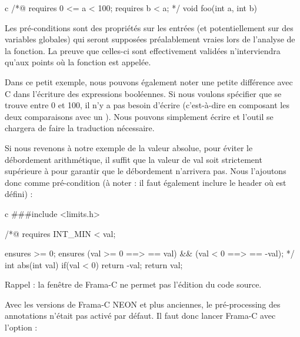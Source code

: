 \begin{CodeBlock}{c}
/*@
  requires 0 <= a < 100;
  requires b < a;
*/
void foo(int a, int b){
  
}
\end{CodeBlock}



Les pré-conditions sont des propriétés sur les entrées (et potentiellement sur
des variables globales) qui seront supposées préalablement vraies lors de 
l'analyse de la fonction. La preuve que celles-ci sont effectivement validées 
n'interviendra qu'aux points où la fonction est appelée.



Dans ce petit exemple, nous pouvons également noter une petite différence avec 
C dans l'écriture des expressions booléennes. Si nous voulons spécifier 
que  se trouve entre 0 et 100, il n'y a pas besoin d'écrire 
(c'est-à-dire en composant les deux comparaisons avec un \CodeInline{\&\&}). Nous 
pouvons simplement écrire  et l'outil se chargera de faire
la traduction nécessaire.



Si nous revenons à notre exemple de la valeur absolue, pour éviter le 
débordement arithmétique, il suffit que la valeur de val soit strictement 
supérieure à  pour garantir que le débordement n'arrivera pas.
Nous l'ajoutons donc comme pré-condition (à noter : il faut également
inclure le header où  est défini) :



\begin{CodeBlock}{c}
###include <limits.h>

/*@
  requires INT_MIN < val;

  ensures \result >= 0;
  ensures (val >= 0 ==> \result == val) && 
          (val < 0 ==> \result == -val);
*/
int abs(int val){
  if(val < 0) return -val;
  return val;
}
\end{CodeBlock}



\begin{Warning}
Rappel : la fenêtre de Frama-C ne permet pas l'édition du code source.
\end{Warning}


\begin{Information}
Avec les versions de Frama-C NEON et plus anciennes, le pré-processing des
annotations n'était pas activé par défaut. Il faut donc lancer Frama-C avec
l'option  :

\end{Information}


